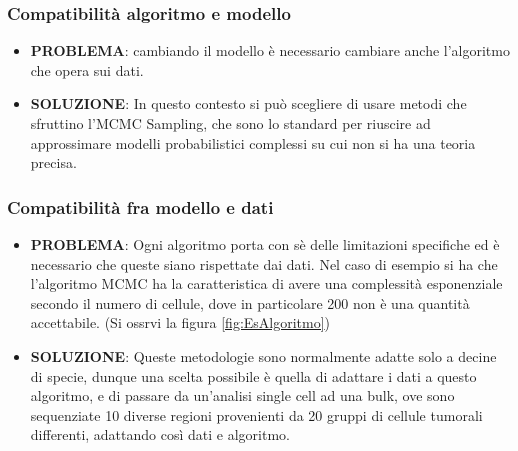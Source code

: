 \documentclass[a4paper]{article}
\begin{document}
	\subsubsection{Compatibilità algoritmo e modello}

	\begin{itemize}
	\item \textbf{PROBLEMA}: cambiando il modello è necessario cambiare anche l'algoritmo che opera sui dati.

	\item \textbf{SOLUZIONE}: In questo contesto si può scegliere di usare metodi che sfruttino l'MCMC Sampling, che sono
	lo standard per riuscire ad approssimare modelli probabilistici complessi su cui non si ha una teoria
	precisa.
	\end{itemize}

	\subsubsection{Compatibilità fra modello e dati}
        
	\begin{itemize}
	\item \textbf{PROBLEMA}: Ogni algoritmo porta con sè delle limitazioni specifiche ed è necessario che
	queste siano rispettate dai dati. Nel caso di esempio si ha che l'algoritmo MCMC ha la caratteristica di
	avere una complessità esponenziale secondo il numero di cellule, dove in particolare 200 non è una quantità accettabile.
	(Si ossrvi la figura \ref{fig:EsAlgoritmo})
	\item \textbf{SOLUZIONE}: Queste metodologie sono normalmente adatte solo a decine di specie, dunque una scelta
	possibile è quella di adattare i dati a questo algoritmo, e di passare da un'analisi single cell ad una bulk,
	ove sono sequenziate 10 diverse regioni provenienti da 20 gruppi di cellule tumorali differenti, adattando
	così dati e algoritmo.
	\end{itemize}
\end{document}
